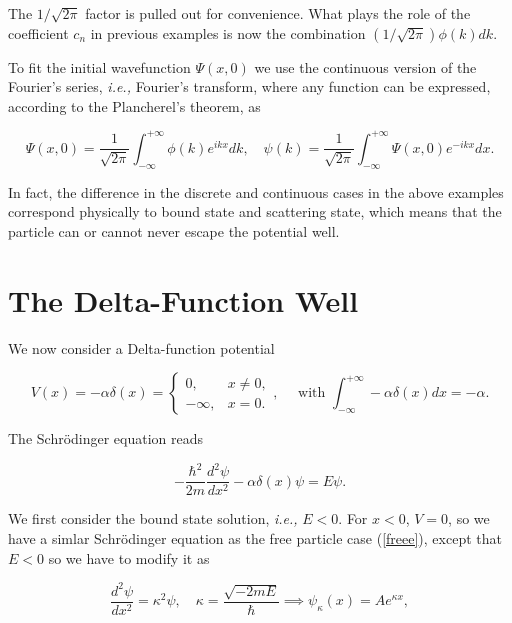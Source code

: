 \documentclass[a4paper,12pt]{report}
\begin{document}
The \(1 / \sqrt{2\pi }  \) factor is pulled out for convenience. What plays the role of the coefficient \(c_{n} \) in previous examples is now the combination \((1/\sqrt{2\pi } )\phi (k)dk\). 

To fit the initial wavefunction \(\Psi (x,0)\) we use the continuous version of the Fourier's series, \textit{i.e.,} Fourier's transform, where any function can be expressed, according to the Plancherel's theorem, as

\begin{equation}
  \Psi (x,0) = \frac{1}{\sqrt{2\pi } } \int_{-\infty}^{+\infty} \phi (k) e^{ikx}dk, \quad \psi  (k) = \frac{1}{\sqrt{2\pi } } \int_{-\infty}^{+\infty} \Psi (x,0) e^{- ikx}dx.     
\end{equation}

In fact, the difference in the discrete and continuous cases in the above examples correspond physically to bound state and scattering state, which means that the particle can or cannot never escape the potential well.

\section{The Delta-Function Well}

We now consider a Delta-function potential

\begin{equation}
  V(x) = -\alpha \delta (x) = \begin{cases}
    0,& x \neq 0,\\
    -\infty,& x=0.
  \end{cases}, \quad \text{ with } \int_{-\infty}^{+\infty} - \alpha \delta (x)dx = -\alpha .  
\end{equation}

The Schrödinger equation reads

\begin{equation}
  -\frac{\hbar ^2}{2m} \frac{d^2\psi }{dx^2} - \alpha \delta (x)\psi  = E\psi . 
\end{equation}

We first consider the bound state solution, \textit{i.e.,} \(E<0\). For \(x<0\), \(V=0\), so we have a simlar Schrödinger equation as the free particle case (\cref{freee}), except that \(E<0\) so we have to modify it as 

\begin{equation}
  \frac{d^2\psi }{dx^2} = \kappa ^2\psi , \quad \kappa = \frac{\sqrt{-2mE} }{\hbar } \implies \psi _{\kappa }(x) = Ae^{\kappa x},
\end{equation}
\end{document}
